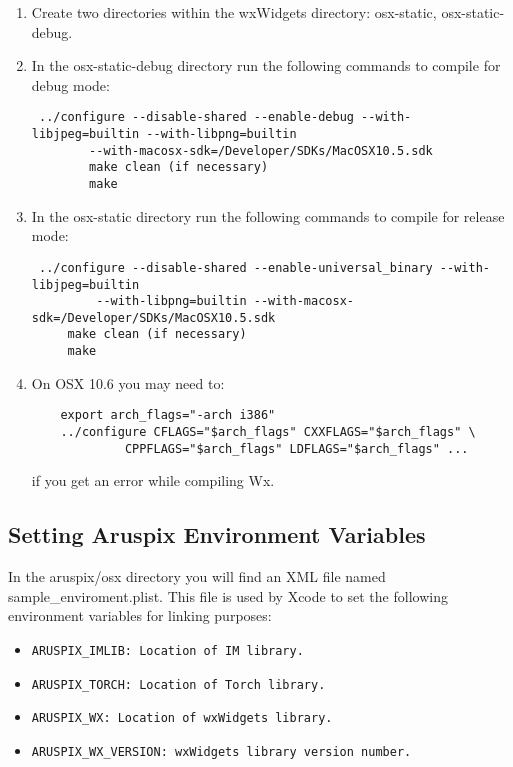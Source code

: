 \documentclass[]{article}
\begin{document}
\begin{enumerate}
	\item Create two directories within the wxWidgets directory: osx-static, osx-static-debug.
	\item In the osx-static-debug directory run the following commands to compile for debug mode:
	\begin{verbatim} ../configure --disable-shared --enable-debug --with-libjpeg=builtin --with-libpng=builtin 
     	--with-macosx-sdk=/Developer/SDKs/MacOSX10.5.sdk
 		make clean (if necessary)
 		make
	\end{verbatim}

	\item In the osx-static directory run the following commands to compile for release mode:
	\begin{verbatim} ../configure --disable-shared --enable-universal_binary --with-libjpeg=builtin
	     --with-libpng=builtin --with-macosx-sdk=/Developer/SDKs/MacOSX10.5.sdk 
	 make clean (if necessary)
	 make
	\end{verbatim}
	\item On OSX 10.6 you may need to:
	\begin{verbatim}
	export arch_flags="-arch i386"
	../configure CFLAGS="$arch_flags" CXXFLAGS="$arch_flags" \
             CPPFLAGS="$arch_flags" LDFLAGS="$arch_flags" ...
	\end{verbatim}
	if you get an error while compiling Wx.
\end{enumerate}


\subsection{Setting Aruspix Environment Variables}
	In the aruspix/osx directory you will find an XML file named sample\_enviroment.plist. This
	file is used by Xcode to set the following environment variables for linking purposes:
	\begin{itemize}
		\item \begin{verbatim}ARUSPIX_IMLIB: Location of IM library.\end{verbatim}
		\item \begin{verbatim}ARUSPIX_TORCH: Location of Torch library.\end{verbatim}
		\item \begin{verbatim}ARUSPIX_WX: Location of wxWidgets library.\end{verbatim}
		\item \begin{verbatim}ARUSPIX_WX_VERSION: wxWidgets library version number.\end{verbatim}
	\end{itemize}
\end{document}
